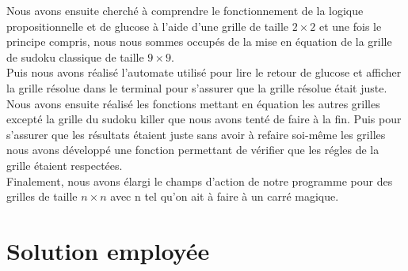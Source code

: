 \documentclass[a4paper,8pt,french,fleqn]{article}
\begin{document}
\begin{center}
  \end{center}

Nous avons ensuite cherché à comprendre le fonctionnement de la logique propositionnelle et de glucose à l'aide d'une grille de taille $2 \times 2$ et une fois le principe compris, nous nous sommes occupés de la mise en équation de la grille de sudoku classique de taille $9 \times 9$. \\

Puis nous avons réalisé l'automate utilisé pour lire le retour de glucose et afficher la grille résolue dans le terminal pour s'assurer que la grille résolue était juste. \\

Nous avons ensuite réalisé les fonctions mettant en équation les autres grilles excepté la grille du sudoku killer que nous avons tenté de faire à la fin. Puis pour s'assurer que les résultats étaient juste sans avoir à refaire soi-même les grilles nous avons développé une fonction permettant de vérifier que les régles de la grille étaient respectées. \\

Finalement, nous avons élargi le champs d'action de notre programme pour des grilles de taille $n \times n$ avec n tel qu'on ait à faire à un carré magique. \\

\newpage

\section{Solution employée}
\end{document}
